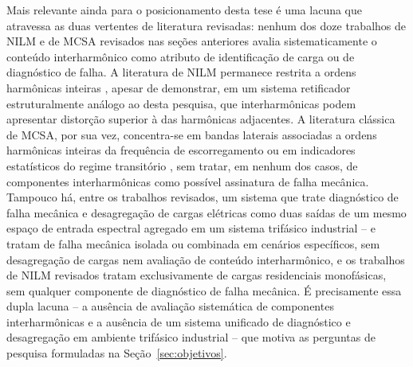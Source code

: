 \documentclass[times,final]{elsarticle}
\begin{document}
Mais relevante ainda para o posicionamento desta tese é uma lacuna que atravessa as duas vertentes de literatura revisadas: nenhum dos doze trabalhos de NILM e de MCSA revisados nas seções anteriores avalia sistematicamente o conteúdo interharmônico como atributo de identificação de carga ou de diagnóstico de falha. A literatura de NILM permanece restrita a ordens harmônicas inteiras \citep{hart1992,zeifman2011,djordjevic2017,bouhouras2017,li2019moea}, apesar de \citet{efe2016} demonstrar, em um sistema retificador estruturalmente análogo ao desta pesquisa, que interharmônicas podem apresentar distorção superior à das harmônicas adjacentes. A literatura clássica de MCSA, por sua vez, concentra-se em bandas laterais associadas a ordens harmônicas inteiras da frequência de escorregamento \citep{thomson2001,nandi2005} ou em indicadores estatísticos do regime transitório \citep{martinez2022}, sem tratar, em nenhum dos casos, de componentes interharmônicas como possível assinatura de falha mecânica. Tampouco há, entre os trabalhos revisados, um sistema que trate diagnóstico de falha mecânica e desagregação de cargas elétricas como duas saídas de um mesmo espaço de entrada espectral agregado em um sistema trifásico industrial -- \citet{benamira2022} e \citet{martinez2022} tratam de falha mecânica isolada ou combinada em cenários específicos, sem desagregação de cargas nem avaliação de conteúdo interharmônico, e os trabalhos de NILM revisados tratam exclusivamente de cargas residenciais monofásicas, sem qualquer componente de diagnóstico de falha mecânica. É precisamente essa dupla lacuna -- a ausência de avaliação sistemática de componentes interharmônicas e a ausência de um sistema unificado de diagnóstico e desagregação em ambiente trifásico industrial -- que motiva as perguntas de pesquisa formuladas na Seção~\ref{sec:objetivos}.
\end{document}
